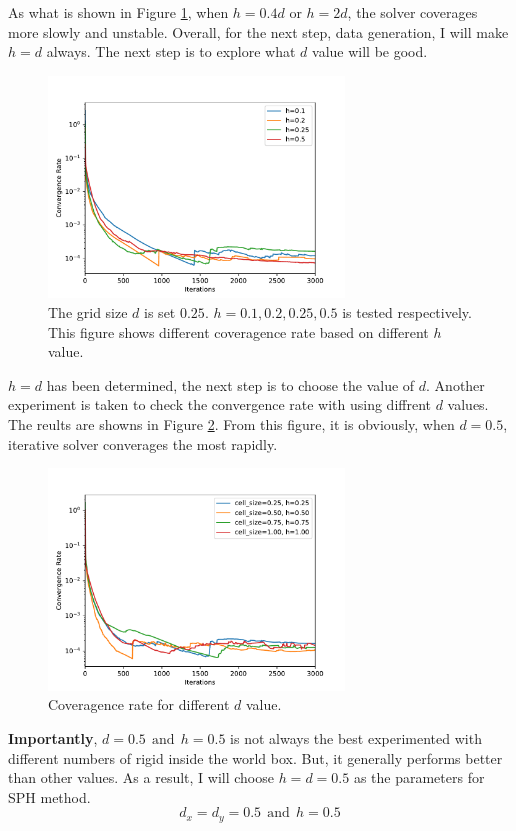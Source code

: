     As what is shown in Figure \ref{fig:dh}, when $h=0.4d$ or $h=2d$, the solver coverages more slowly and unstable. Overall, for the next step, data generation, I will make $h=d$ always. The next step is to explore what $d$ value will be good.
    \begin{figure}[!ht]
        \centering
        \includegraphics[width=0.7\textwidth]{Figures/size25.pdf}
        \caption{The grid size $d$ is set $0.25$. $h=0.1, 0.2, 0.25, 0.5$ is tested respectively. This figure shows different coveragence rate based on different $h$ value.}
        \label{fig:dh}
    \end{figure}
    $h=d$ has been determined, the next step is to choose the value of $d$. Another experiment is taken to check the convergence rate with using diffrent $d$ values. The reults are showns in Figure \ref{fig:testd}. From this figure, it is obviously, when $d=0.5$, iterative solver converages the most rapidly. 
    \begin{figure}[!ht]
        \centering
        \includegraphics[width=0.7\textwidth]{Figures/hd.pdf}
        \caption{Coveragence rate for different $d$ value.}
        \label{fig:testd}
    \end{figure}
    \textbf{Importantly}, $d=0.5~~\text{and}~~h=0.5$ is not always the best experimented with different numbers of rigid inside the world box. But, it generally performs better than other values. As a result, I will choose $h=d=0.5$ as the parameters for SPH method.
    $$d_x = d_y = 0.5~~\text{and}~~h=0.5$$
